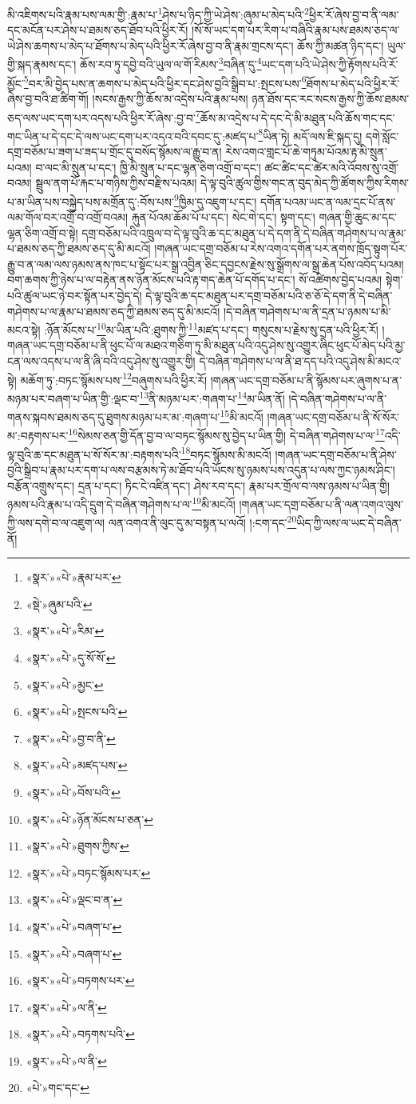 མི་འཇིགས་པའི་རྣམ་པས་ལམ་གྱི་:རྣམ་པ་\footnote{«སྣར་»«པེ་»རྣམ་པར་}ཤེས་པ་ཉིད་ཀྱི་ཡེ་ཤེས་:ཞུམ་པ་མེད་པའི་\footnote{«སྡེ་»ཞུམ་པའི་}ཕྱིར་རོ་ཞེས་བྱ་བ་ནི་ལམ་དང་མངོན་པར་ཤེས་པ་ཐམས་ཅད་ཐོབ་པའི་ཕྱིར་རོ། །སོ་སོ་ཡང་དག་པར་རིག་པ་བཞིའི་རྣམ་པས་ཐམས་ཅད་ལ་ཡེ་ཤེས་ཆགས་པ་མེད་པ་ཐོགས་པ་མེད་པའི་ཕྱིར་རོ་ཞེས་བྱ་བ་ནི་རྣམ་གྲངས་དང་། ཆོས་ཀྱི་མཚན་ཉིད་དང་། ཡུལ་གྱི་སྐད་རྣམས་དང་། ཆོས་རབ་ཏུ་དབྱེ་བའི་ཡུལ་ལ་གོ་རིམས་\footnote{«སྣར་»«པེ་»རིམ་}བཞིན་དུ་\footnote{«སྣར་»«པེ་»དུ་སོ་སོ་}ཡང་དག་པའི་ཡེ་ཤེས་ཀྱི་རྟོགས་པའི་རོ་མྱོང་\footnote{«སྣར་»«པེ་»མྱང་}བར་མི་བྱེད་པས་ན་ཆགས་པ་མེད་པའི་ཕྱིར་དང་ཤེས་བྱའི་སྒྲིབ་པ་:སྤངས་པས་\footnote{«སྣར་»«པེ་»སྤངས་པའི་}ཐོགས་པ་མེད་པའི་ཕྱིར་རོ་ཞེས་བྱ་བའི་ཐ་ཚིག་གོ། །སངས་རྒྱས་ཀྱི་ཆོས་མ་འདྲེས་པའི་རྣམ་པས། ཉན་ཐོས་དང་རང་སངས་རྒྱས་ཀྱི་ཆོས་ཐམས་ཅད་ལས་ཡང་དག་པར་འདས་པའི་ཕྱིར་རོ་ཞེས་:བྱ་བ་\footnote{«སྣར་»«པེ་»བྱ་བ་ནི་}ཆོས་མ་འདྲེས་པ་དེ་དང་དེ་མི་མཐུན་པའི་ཆོས་གང་དང་གང་ཡིན་པ་དེ་དང་དེ་ལས་ཡང་དག་པར་འདའ་བའི་དབང་དུ་:མཛད་པ་\footnote{«སྣར་»«པེ་»མཛད་པས་}ཡིན་ཏེ། མདོ་ལས་ཇི་སྐད་དུ། དགེ་སློང་དགྲ་བཅོམ་པ་ཟག་པ་ཟད་པ་གྲོང་དུ་བསོད་སྙོམས་ལ་རྒྱུ་བ་ན། རེས་འགའ་གླང་པོ་ཆེ་གཏུམ་པོའམ་རྟ་མི་སྲུན་པའམ། བ་ལང་མི་སྲུན་པ་དང་། ཁྱི་མི་སྲུན་པ་དང་ལྷན་ཅིག་འགྲོ་བ་དང་། ཚང་ཚིང་དང་ཚེར་མའི་འོབས་སུ་འགྲོ་བའམ། སྦྲུལ་ནག་པོ་རྐང་པ་གཉིས་ཀྱིས་བརྫིས་པའམ། དེ་ལྟ་བུའི་ཚུལ་གྱིས་གང་ན་བུད་མེད་ཀྱི་ཚོགས་ཀྱིས་རིགས་པ་མ་ཡིན་པས་བསྐྱེད་པས་མགྲོན་དུ་:བོས་པས་\footnote{«སྣར་»«པེ་»བོས་པའི་}ཁྱིམ་དུ་འཇུག་པ་དང་། དགོན་པའམ་ཡང་ན་ལམ་དྲང་པོ་ནས་ལམ་གོལ་བར་འགྲོ་བ་འགྲོ་བའམ། རྐུན་པོའམ་ཆོམ་པོ་པ་དང་། སེང་གེ་དང་། སྟག་དང་། གཞན་གྱི་ཆུང་མ་དང་ལྷན་ཅིག་འགྲོ་བ་སྟེ། དགྲ་བཅོམ་པའི་འཁྲུལ་བ་དེ་ལྟ་བུའི་ཆ་དང་མཐུན་པ་དེ་དག་ནི་དེ་བཞིན་གཤེགས་པ་ལ་རྣམ་པ་ཐམས་ཅད་ཀྱི་ཐམས་ཅད་དུ་མི་མངའོ། །གཞན་ཡང་དགྲ་བཅོམ་པ་རེས་འགའ་དགོན་པར་ནགས་ཁྲོད་སྟུག་པོར་རྒྱུ་བ་ན་ལམ་ལས་ཉམས་ནས་ཁང་པ་སྟོང་པར་སྒྲ་འབྱིན་ཅིང་དབྱངས་རྗེས་སུ་སྒྲོགས་ལ་སྒྲ་ཆེན་པོས་འབོད་པའམ། བག་ཆགས་ཀྱི་ཉེས་པ་ལ་བརྟེན་ནས་ཉོན་མོངས་པའི་རྟ་གད་ཆེན་པོ་དགོད་པ་དང་། སོ་འཚིགས་བྱེད་པའམ། སྟེག་པའི་ཚུལ་ཡང་ཉེ་བར་སྟོན་པར་བྱེད་དེ། དེ་ལྟ་བུའི་ཆ་དང་མཐུན་པར་དགྲ་བཅོམ་པའི་ཅ་ཅོ་དེ་དག་ནི་དེ་བཞིན་གཤེགས་པ་ལ་རྣམ་པ་ཐམས་ཅད་ཀྱི་ཐམས་ཅད་དུ་མི་མངའོ། །དེ་བཞིན་གཤེགས་པ་ལ་ནི་དྲན་པ་ཉམས་པ་མི་མངའ་སྟེ། :ཉོན་མོངས་པ་\footnote{«སྣར་»«པེ་»ཉོན་མོངས་པ་ཅན་}མ་ཡིན་པའི་:ཐུགས་ཀྱི་\footnote{«སྣར་»«པེ་»ཐུགས་ཀྱིས་}མཛད་པ་དང་། གསུངས་པ་རྗེས་སུ་དྲན་པའི་ཕྱིར་རོ། །གཞན་ཡང་དགྲ་བཅོམ་པ་ནི་ཕུང་པོ་ལ་མཐའ་གཅིག་ཏུ་མི་མཐུན་པའི་འདུ་ཤེས་སུ་འགྱུར་ཞིང་ཕུང་པོ་མེད་པའི་མྱ་ངན་ལས་འདས་པ་ལ་ནི་ཞི་བའི་འདུ་ཤེས་སུ་འགྱུར་གྱི། དེ་བཞིན་གཤེགས་པ་ལ་ནི་ཐ་དད་པའི་འདུ་ཤེས་མི་མངའ་སྟེ། མཆོག་ཏུ་:བཏང་སྙོམས་པས་\footnote{«སྣར་»«པེ་»བཏང་སྙོམས་པར་}བཞུགས་པའི་ཕྱིར་རོ། །གཞན་ཡང་དགྲ་བཅོམ་པ་ནི་སྙོམས་པར་ཞུགས་པ་ན་མཉམ་པར་བཞག་པ་ཡིན་གྱི་:ལྡང་བ་\footnote{«སྣར་»«པེ་»ལྡང་བ་ན་}ནི་མཉམ་པར་:གཞག་པ་\footnote{«སྣར་»«པེ་»བཞག་པ་}མ་ཡིན་ནོ། །དེ་བཞིན་གཤེགས་པ་ལ་ནི་གནས་སྐབས་ཐམས་ཅད་དུ་ཐུགས་མཉམ་པར་མ་:གཞག་པ་\footnote{«སྣར་»«པེ་»བཞག་པ་}མི་མངའོ། །གཞན་ཡང་དགྲ་བཅོམ་པ་ནི་སོ་སོར་མ་:བརྟགས་པར་\footnote{«སྣར་»«པེ་»བཏགས་པར་}སེམས་ཅན་གྱི་དོན་བྱ་བ་ལ་བཏང་སྙོམས་སུ་བྱེད་པ་ཡིན་གྱི། དེ་བཞིན་གཤེགས་པ་ལ་\footnote{«སྣར་»«པེ་»ལ་ནི་}འདི་ལྟ་བུའི་ཆ་དང་མཐུན་པ་སོ་སོར་མ་:བརྟགས་པའི་\footnote{«སྣར་»«པེ་»བཏགས་པའི་}བཏང་སྙོམས་མི་མངའོ། །གཞན་ཡང་དགྲ་བཅོམ་པ་ནི་ཤེས་བྱའི་སྒྲིབ་པ་རྣམ་པར་དག་པ་ལས་བརྩམས་ཏེ་མ་ཐོབ་པའི་ཡོངས་སུ་ཉམས་པས་འདུན་པ་ལས་ཀྱང་ཉམས་ཤིང་། བརྩོན་འགྲུས་དང་། དྲན་པ་དང་། ཏིང་ངེ་འཛིན་དང་། ཤེས་རབ་དང་། རྣམ་པར་གྲོལ་བ་ལས་ཉམས་པ་ཡིན་གྱི། ཉམས་པའི་རྣམ་པ་འདི་དྲུག་དེ་བཞིན་གཤེགས་པ་ལ་\footnote{«སྣར་»«པེ་»ལ་ནི་}མི་མངའོ། །གཞན་ཡང་དགྲ་བཅོམ་པ་ནི་ལན་འགའ་ལུས་ཀྱི་ལས་དགེ་བ་ལ་འཇུག་ལ། ལན་འགའ་ནི་ལུང་དུ་མ་བསྟན་པ་ལའོ། །:ངག་དང་\footnote{«པེ་»གང་དང་}ཡིད་ཀྱི་ལས་ལ་ཡང་དེ་བཞིན་ནོ། 